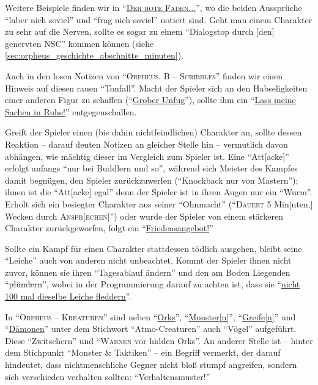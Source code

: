 \documentclass[a5paper,pagesize,numbers=noenddot]{scrbook}
\begin{document}
Weitere Beispiele finden wir in \enquote{\uline{\textsc{Der rote Faden...}}}, wo die beiden Aussprüche \enquote{laber nich soviel} und \enquote{frag nich soviel} notiert sind.\autocite[S.~3]{orpheus_der_rote}
Geht man einem Charakter zu sehr auf die Nerven, sollte es sogar zu einem \enquote{Dialogstop durch [den] genervten NSC} kommen können (siehe \autoref{sec:orpheus_geschichte_abschnitte_minuten}).\autocite[S.~2]{orpheus_der_rote}

Auch in den losen Notizen von \enquote{\textsc{Orpheus. B -- Scribbles}} finden wir einen Hinweis auf diesen rauen \enquote{Tonfall}.\autocite[S.~8]{orpheus_b_scribbles}
Macht der Spieler sich an den Habseligkeiten einer anderen Figur zu schaffen (\enquote{\uline{Grober Unfug}}), sollte ihm ein \enquote{\uline{Lass meine Sachen in Ruhe!}} entgegenschallen.\autocite[S.~9]{orpheus_b_scribbles}

Greift der Spieler einen (bis dahin nichtfeindlichen) Charakter an, sollte dessen Reaktion -- darauf deuten Notizen an gleicher Stelle hin -- vermutlich davon abhängen, wie mächtig dieser im Vergleich zum Spieler ist.
Eine \enquote{Att[acke]} erfolgt anfangs \enquote{nur bei Buddlern und so}, während sich Meister des Kampfes damit begnügen, den Spieler zurückzuwerfen (\enquote{Knockback nur von Mastern}); ihnen ist die \enquote{Att[acke] egal} denn der Spieler ist in ihren Augen nur ein \enquote{Wurm}.
Erholt sich ein besiegter Charakter aus seiner \enquote{Ohnmacht} (\enquote{\textsc{Dauert} 5 Min[uten,] Wecken durch \textsc{Anspr[echen]}}) oder wurde der Spieler von einem stärkeren Charakter zurückgeworfen, folgt ein \enquote{\uline{Friedensangebot!}}

Sollte ein Kampf für einen Charakter stattdessen tödlich ausgehen, bleibt seine \enquote{Leiche} auch von anderen nicht unbeachtet.
Kommt der Spieler ihnen nicht zuvor, können sie ihren \enquote{Tagesablauf ändern} und den am Boden Liegenden \enquote{\sout{plündern}}, wobei in der Programmierung darauf zu achten ist, dass sie \enquote{\uline{nicht 100 mal dieselbe Leiche fleddern}}.

In \enquote{\textsc{Orpheus -- Kreaturen}} sind neben \enquote{\uline{Orks}}, \enquote{\uline{Monster[n]}}, \enquote{\uline{Greife[n]}} und \enquote{\uline{Dämonen}} unter dem Stichwort \enquote{Atmo-Creaturen} auch \enquote{Vögel} aufgeführt.
Diese \enquote{Zwitschern} und \enquote{\textsc{Warnen} vor hidden Orks}.
An anderer Stelle ist -- hinter dem Stichpunkt \enquote{Monster \&  Taktiken} -- ein Begriff vermerkt, der darauf hindeutet, dass nichtmenschliche Gegner nicht bloß stumpf angreifen, sondern sich verschieden verhalten sollten: \enquote{Verhaltensmuster!}\autocite[S.~8]{orpheus_b_scribbles}
\end{document}
